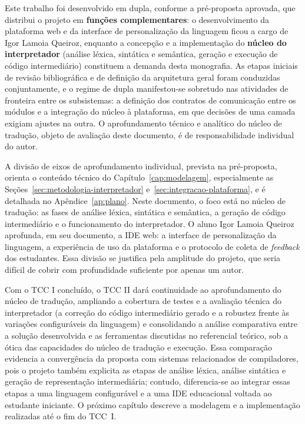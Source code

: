 Este trabalho foi desenvolvido em dupla, conforme a pré-proposta aprovada, que distribui o projeto em \textbf{funções complementares}: o desenvolvimento da plataforma web e da interface de personalização da linguagem ficou a cargo de Igor Lamoia Queiroz, enquanto a concepção e a implementação do \textbf{núcleo do interpretador} (análise léxica, sintática e semântica, geração e execução de código intermediário) constituem a demanda desta monografia. As etapas iniciais de revisão bibliográfica e de definição da arquitetura geral foram conduzidas conjuntamente, e o regime de dupla manifestou-se sobretudo nas atividades de fronteira entre os subsistemas: a definição dos contratos de comunicação entre os módulos e a integração do núcleo à plataforma, em que decisões de uma camada exigiam ajustes na outra. O aprofundamento técnico e analítico do núcleo de tradução, objeto de avaliação deste documento, é de responsabilidade individual do autor.

A divisão de eixos de aprofundamento individual, prevista na pré-proposta, orienta o conteúdo técnico do Capítulo~\ref{cap:modelagem}, especialmente as Seções~\ref{sec:metodologia-interpretador} e~\ref{sec:integracao-plataforma}, e é detalhada no Apêndice~\ref{ap:plano}. Neste documento, o foco está no núcleo de tradução: as fases de análise léxica, sintática e semântica, a geração de código intermediário e o funcionamento do interpretador. O aluno Igor Lamoia Queiroz aprofunda, em seu documento, a IDE web: a interface de personalização da linguagem, a experiência de uso da plataforma e o protocolo de coleta de \textit{feedback} dos estudantes. Essa divisão se justifica pela amplitude do projeto, que seria difícil de cobrir com profundidade suficiente por apenas um autor.

Com o TCC I concluído, o TCC II dará continuidade ao aprofundamento do núcleo de tradução, ampliando a cobertura de testes e a avaliação técnica do interpretador (a correção do código intermediário gerado e a robustez frente às variações configuráveis da linguagem) e consolidando a análise comparativa entre a solução desenvolvida e as ferramentas discutidas no referencial teórico, sob a ótica das capacidades do núcleo de tradução e execução. Essa comparação evidencia a convergência da proposta com sistemas relacionados de compiladores, pois o projeto também explicita as etapas de análise léxica, análise sintática e geração de representação intermediária; contudo, diferencia-se ao integrar essas etapas a uma linguagem configurável e a uma IDE educacional voltada ao estudante iniciante. O próximo capítulo descreve a modelagem e a implementação realizadas até o fim do TCC~I.

